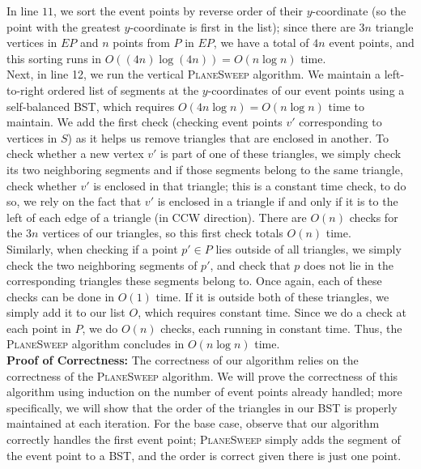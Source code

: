 \documentclass[11pt]{article}
\begin{document}
\begin{enumerate}
    In line $11$, we sort the event points by reverse order of their $y$-coordinate (so the point with the greatest $y$-coordinate is first in the list); since there are $3n$ triangle vertices in $EP$ and $n$ points from $P$ in $EP$, we have a total of $4n$ event points, and this sorting runs in $O((4n) \log (4n)) = O(n \log n)$ time. \\
    
    Next, in line 12, we run the vertical \textsc{PlaneSweep} algorithm. We maintain a left-to-right ordered list of segments at the $y$-coordinates of our event points using a self-balanced BST, which requires $O(4n \log n) = O(n \log n)$ time to maintain. We add the first check (checking event points $v'$ corresponding to vertices in $S$) as it helps us remove triangles that are enclosed in another. To check whether a new vertex $v'$ is part of one of these triangles, we simply check its two neighboring segments and if those segments belong to the same triangle, check whether $v'$ is enclosed in that triangle; this is a constant time check, to do so, we rely on the fact that $v'$ is enclosed in a triangle if and only if it is to the left of each edge of a triangle (in CCW direction). There are $O(n)$ checks for the $3n$ vertices of our triangles, so this first check totals $O(n)$ time. \\
    
    Similarly, when checking if a point $p' \in P$ lies outside of all triangles, we simply check the two neighboring segments of $p'$, and check that $p$ does not lie in the corresponding triangles these segments belong to. Once again, each of these checks can be done in $O(1)$ time. If it is outside both of these triangles, we simply add it to our list $O$, which requires constant time. Since we do a check at each point in $P$, we do $O(n)$ checks, each running in constant time. Thus, the \textsc{PlaneSweep} algorithm concludes in $O(n \log n)$ time. \\

    \textbf{Proof of Correctness:} The correctness of our algorithm relies on the correctness of the \textsc{PlaneSweep} algorithm. We will prove the correctness of this algorithm using induction on the number of event points already handled; more specifically, we will show that the order of the triangles in our BST is properly maintained at each iteration. For the base case, observe that our algorithm correctly handles the first event point; \textsc{PlaneSweep} simply adds the segment of the event point to a BST, and the order is correct given there is just one point. \\
    

\end{enumerate}
\end{document}
